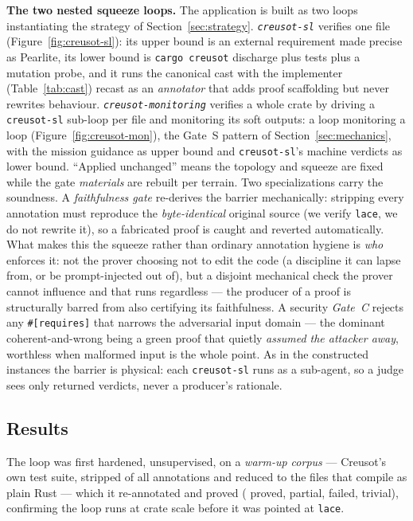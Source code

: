 \documentclass[11pt]{article}
\newcommand{\code}[1]{\texttt{#1}}
\begin{document}
\textbf{The two nested squeeze loops.} The application is built as two loops instantiating the
strategy of Section~\ref{sec:strategy}. \emph{\code{creusot-sl}} verifies one file
(Figure~\ref{fig:creusot-sl}): its upper
bound is an external requirement made precise as Pearlite, its lower bound is \code{cargo
creusot} discharge plus tests plus a mutation probe, and it runs the canonical cast with the
implementer (Table~\ref{tab:cast}) recast as an \emph{annotator} that adds proof scaffolding but
never rewrites behaviour. \emph{\code{creusot-monitoring}} verifies a whole crate by driving a
\code{creusot-sl} sub-loop per file and monitoring its soft outputs: a loop monitoring a loop
(Figure~\ref{fig:creusot-mon}),
the Gate~S pattern of Section~\ref{sec:mechanics}, with the mission guidance as upper bound and
\code{creusot-sl}'s machine verdicts as lower bound. ``Applied unchanged'' means the topology
and squeeze are fixed while the gate \emph{materials} are rebuilt per terrain. Two
specializations carry the soundness. A \emph{faithfulness gate} re-derives the barrier
mechanically: stripping every annotation must reproduce the \emph{byte-identical} original source
(we verify \code{lace}, we do not rewrite it), so a fabricated proof is caught and reverted
automatically. What makes this the squeeze rather than ordinary annotation hygiene is \emph{who}
enforces it: not the prover choosing not to edit the code (a discipline it can lapse from, or be
prompt-injected out of), but a disjoint mechanical check the prover cannot influence and that runs
regardless --- the producer of a proof is structurally barred from also certifying its faithfulness. A security \emph{Gate~C} rejects any \code{\#[requires]} that narrows the
adversarial input domain --- the dominant coherent-and-wrong being a green proof that quietly
\emph{assumed the attacker away}, worthless when malformed input is the whole point. As in the
constructed instances the barrier is physical: each \code{creusot-sl} runs as a sub-agent, so a
judge sees only returned verdicts, never a producer's rationale.

\subsection{Results}
\label{sec:realworld-results}

The loop was first hardened, unsupervised, on a \emph{warm-up corpus} --- Creusot's own test
suite, stripped of all annotations and reduced to the \ResRWCorpusFiles{} files that compile as
plain Rust --- which it re-annotated and proved (\ResRWCorpusProved{} proved,
\ResRWCorpusPartial{} partial, \ResRWCorpusFailed{} failed, \ResRWCorpusTrivial{} trivial),
confirming the loop runs at crate scale before it was pointed at \code{lace}.
\end{document}
